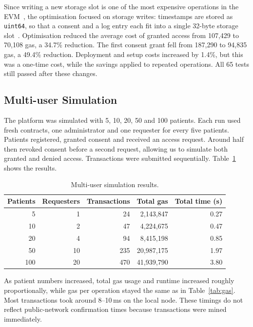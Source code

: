 \documentclass[10pt,a4paper]{article}
\begin{document}
Since writing a new storage slot is one of the most expensive operations in the EVM~\cite{yellowpaper,eip2929}, the optimisation focused on storage writes: timestamps are stored as \texttt{uint64}, so that a consent and a log entry each fit into a single 32-byte storage slot~\cite{soliditydocs}. Optimisation reduced the average cost of granted access from 107,429 to 70,108 gas, a 34.7\% reduction. The first consent grant fell from 187,290 to 94,835 gas, a 49.4\% reduction. Deployment and setup costs increased by 1.4\%, but this was a one-time cost, while the savings applied to repeated operations. All 65 tests still passed after these changes.

\subsection{Multi-user Simulation}
\label{sec:simulation}

The platform was simulated with 5, 10, 20, 50 and 100 patients. Each run used fresh contracts, one administrator and one requester for every five patients. Patients registered, granted consent and received an access request. Around half then revoked consent before a second request, allowing us to simulate both granted and denied access. Transactions were submitted sequentially. Table~\ref{tab:sim} shows the results.

\begin{table}[htbp]
  \centering
  \footnotesize
  \begin{tabular}{rrrrr}
    \toprule
    \textbf{Patients} & \textbf{Requesters} & \textbf{Transactions} & \textbf{Total gas} & \textbf{Total time (s)} \\
    \midrule
    5   & 1  & 24  & 2,143,847  & 0.27 \\
    10  & 2  & 47  & 4,224,675  & 0.47 \\
    20  & 4  & 94  & 8,415,198  & 0.85 \\
    50  & 10 & 235 & 20,987,175 & 1.97 \\
    100 & 20 & 470 & 41,939,790 & 3.80 \\
    \bottomrule
  \end{tabular}
  \caption{Multi-user simulation results.}
  \label{tab:sim}
\end{table}

As patient numbers increased, total gas usage and runtime increased roughly proportionally, while gas per operation stayed the same as in Table~\ref{tab:gas}. Most transactions took around 8--10\,ms on the local node. These timings do not reflect public-network confirmation times because transactions were mined immediately.
\end{document}

